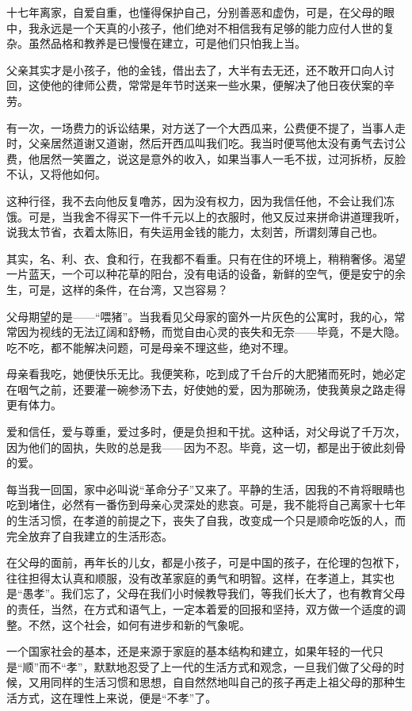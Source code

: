 \par 十七年离家，自爱自重，也懂得保护自己，分别善恶和虚伪，可是，在父母的眼中，我永远是一个天真的小孩子，他们绝对不相信我有足够的能力应付人世的复杂。虽然品格和教养是已慢慢在建立，可是他们只怕我上当。
\par 父亲其实才是小孩子，他的金钱，借出去了，大半有去无还，还不敢开口向人讨回，这使他的律师公费，常常是年节时送来一些水果，便解决了他日夜伏案的辛劳。
\par 有一次，一场费力的诉讼结果，对方送了一个大西瓜来，公费便不提了，当事人走时，父亲居然道谢又道谢，然后开西瓜叫我们吃。我当时便骂他太没有勇气去讨公费，他居然一笑置之，说这是意外的收入，如果当事人一毛不拔，过河拆桥，反脸不认，又将他如何。
\par 这种行径，我不去向他反复噜苏，因为没有权力，因为我信任他，不会让我们冻饿。可是，当我舍不得买下一件千元以上的衣服时，他又反过来拼命讲道理我听，说我太节省，衣着太陈旧，有失运用金钱的能力，太刻苦，所谓刻薄自己也。
\par 其实，名、利、衣、食和行，在我都不看重。只有在住的环境上，稍稍奢侈。渴望一片蓝天，一个可以种花草的阳台，没有电话的设备，新鲜的空气，便是安宁的余生，可是，这样的条件，在台湾，又岂容易？
\par 父母期望的是——“喂猪”。当我看见父母家的窗外一片灰色的公寓时，我的心，常常因为视线的无法辽阔和舒畅，而觉自由心灵的丧失和无奈——毕竟，不是大隐。吃不吃，都不能解决问题，可是母亲不理这些，绝对不理。
\par 母亲看我吃，她便快乐无比。我便笑称，吃到成了千台斤的大肥猪而死时，她必定在咽气之前，还要灌一碗参汤下去，好使她的爱，因为那碗汤，使我黄泉之路走得更有体力。
\par 爱和信任，爱与尊重，爱过多时，便是负担和干扰。这种话，对父母说了千万次，因为他们的固执，失败的总是我——因为不忍。毕竟，这一切，都是出于彼此刻骨的爱。
\par 每当我一回国，家中必叫说“革命分子”又来了。平静的生活，因我的不肯将眼睛也吃到堵住，必然有一番伤到母亲心灵深处的悲哀。可是，我不能将自己离家十七年的生活习惯，在孝道的前提之下，丧失了自我，改变成一个只是顺命吃饭的人，而完全放弃了自我建立的生活形态。
\par 在父母的面前，再年长的儿女，都是小孩子，可是中国的孩子，在伦理的包袱下，往往担得太认真和顺服，没有改革家庭的勇气和明智。这样，在孝道上，其实也是“愚孝”。我们忘了，父母在我们小时候教导我们，等我们长大了，也有教育父母的责任，当然，在方式和语气上，一定本着爱的回报和坚持，双方做一个适度的调整。不然，这个社会，如何有进步和新的气象呢。
\par 一个国家社会的基本，还是来源于家庭的基本结构和建立，如果年轻的一代只是“顺”而不“孝”，默默地忍受了上一代的生活方式和观念，一旦我们做了父母的时候，又用同样的生活习惯和思想，自自然然地叫自己的孩子再走上祖父母的那种生活方式，这在理性上来说，便是“不孝”了。
